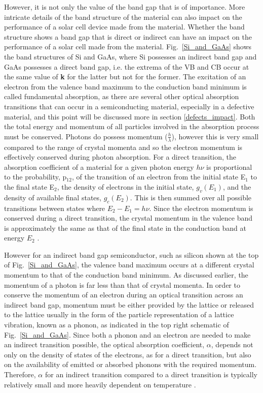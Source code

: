 \documentclass[11pt, twoside]{report}
\begin{document}
However, it is not only the value of the band gap that is of importance. More intricate details of the band structure of the material can also impact on the performance of a solar cell device made from the material. Whether the band structure shows a band gap that is direct or indirect can have an impact on the performance of a solar cell made from the material. Fig.~\ref{Si_and_GaAs} shows the band structures of Si and GaAs, where Si possesses an indirect band gap and GaAs possesses a direct band gap, i.e. the extrema of the VB and CB occur at the same value of \textbf{k} for the latter but not for the former. The excitation of an electron from the valence band maximum to the conduction band minimum is called fundamental absorption, as there are several other optical absorption transitions that can occur in a semiconducting material, especially in a defective material, and this point will be discussed more in section \ref{defects_impact}. Both the total energy and momentum of all particles involved in the absorption process must be conserved. Photons do possess momentum ($\frac{h}{\lambda}$), however this is very small compared to the range of crystal momenta and so the electron momentum is effectively conserved during photon absorption. For a direct transition, the absorption coefficient of a material for a given photon energy $h \nu$ is proportional to the probability, p$_{12}$, of the transition of an electron from the initial state E$_1$ to the final state E$_2$, the density of electrons in the initial state, $g_{v}(E_1)$, and the density of available final states, $g_{c}(E_2)$. This is then summed over all possible transitions between states where $E_2 - E_1 = h\nu$. Since the electron momentum is conserved during a direct transition, the crystal momentum in the valence band is approximately the same as that of the final state in the conduction band at energy $E_2$ \cite{PV_bands_book}.

However for an indirect band gap semiconductor, such as silicon shown at the top of Fig.~\ref{Si_and_GaAs}, the valence band maximum occurs at a different crystal momentum to that of the conduction band minimum. As discussed earlier, the momentum of a photon is far less than that of crystal momenta. In order to conserve the momentum of an electron during an optical transition across an indirect band gap, momentum must be either provided by the lattice or released to the lattice usually in the form of the particle representation of a lattice vibration, known as a phonon, as indicated in the top right schematic of Fig.~\ref{Si_and_GaAs}. Since both a phonon and an electron are needed to make an indirect transition possible, the optical absorption coefficient, $\alpha$, depends not only on the density of states of the electrons, as for a direct transition, but also on the availability of emitted or absorbed phonons with the required momentum. Therefore, $\alpha$ for an indirect transition compared to a direct transition is typically relatively small and more heavily dependent on temperature \cite{Nelson3}. 
\end{document}

